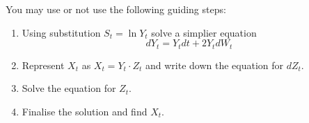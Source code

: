 \documentclass[12pt, a4paper]{article}
\begin{document}
\begin{enumerate}
You may use or not use the following guiding steps:

\begin{enumerate}
\item Using substitution $S_t = \ln Y_t$ solve a simplier equation
\[
dY_t = Y_t dt + 2Y_t dW_t
\]
\item Represent $X_t$ as $X_t = Y_t \cdot Z_t$ and write down the equation for $dZ_t$.
\item Solve the equation for $Z_t$.
\item Finalise the solution and find $X_t$.
\end{enumerate}

\end{enumerate}

\end{document}
